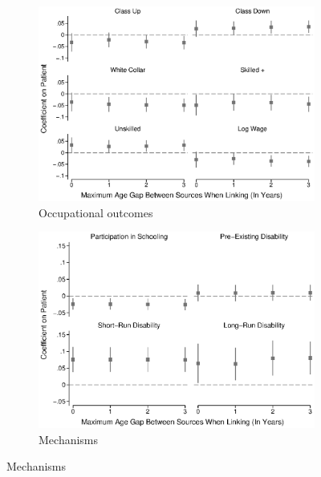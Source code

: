 \documentclass[12pt,english]{article}
\begin{document}
\begin{figure}
\caption[Robustness to changing age-gap threshold for linking]{Robustness to changing age-gap threshold for linking}
\centering
\begin{subfigure}{0.46\textwidth}
    \centering
    \includegraphics[width=1.0\linewidth]{../output/01_paper/figure_03a.eps}
    \caption{Occupational outcomes}
    \label{fig:age-gap-robust-occupational}
\end{subfigure}
\begin{subfigure}{0.46\textwidth}
    \centering
    \includegraphics[width=1.0\linewidth]{../output/01_paper/figure_03b.eps}
    \caption{Mechanisms}
    \label{fig:age-gap-robust-mechanisms}
\end{subfigure}

\end{figure}
\end{document}
